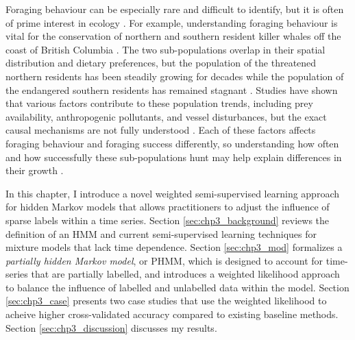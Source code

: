 Foraging behaviour can be especially rare and difficult to identify, but it is often of prime interest in ecology \citep{Stephens:2008, Saldanha:2023}. For example, understanding foraging behaviour is vital for the conservation of northern and southern resident killer whales off the coast of British Columbia \citep{Lusseau:2009, Joy:2019, Tennessen:2023}. The two sub-populations overlap in their spatial distribution and dietary preferences, but the population of the threatened northern residents has been steadily growing for decades while the population of the endangered southern residents has remained stagnant \citep{DFO:2018,Tennessen:2023}.  %
Studies have shown that various factors contribute to these population trends, including prey availability, anthropogenic pollutants, and vessel disturbances, but the exact causal mechanisms are not fully understood \citep{Lusseau:2009, Joy:2019, Murray:2021}. Each of these factors affects foraging behaviour and foraging success differently, so understanding how often and how successfully these sub-populations hunt may help explain differences in their growth \citep{Noren:2011, Tennessen:2023}. 
 
In this chapter, I introduce a novel weighted semi-supervised learning approach for hidden Markov models that allows practitioners to adjust the influence of sparse labels within a time series. 
Section \ref{sec:chp3_background} reviews the definition of an HMM and current semi-supervised learning techniques for %
mixture models that lack time dependence. Section \ref{sec:chp3_mod} formalizes a \textit{partially hidden Markov model}, or PHMM, which is designed to account for time-series that are partially labelled, and introduces a weighted likelihood approach to balance the influence of labelled and unlabelled data within the model. Section \ref{sec:chp3_case} presents two case studies that use the weighted likelihood to acheive higher cross-validated accuracy compared to existing baseline methods. Section \ref{sec:chp3_discussion} discusses my results.

